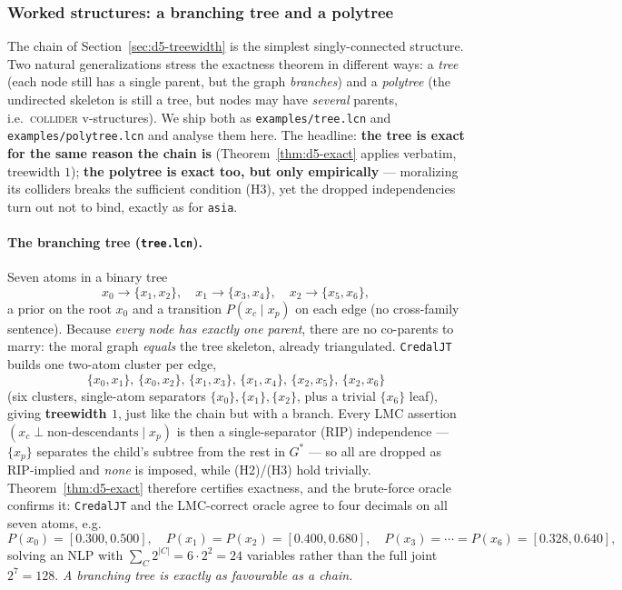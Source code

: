 \documentclass[11pt]{article}
\begin{document}
\subsubsection{Worked structures: a branching tree and a polytree}\label{sec:d5-tree-polytree}

The chain of Section~\ref{sec:d5-treewidth} is the simplest singly-connected structure. Two natural
generalizations stress the exactness theorem in different ways: a \emph{tree} (each node still has a
single parent, but the graph \emph{branches}) and a \emph{polytree} (the undirected skeleton is still
a tree, but nodes may have \emph{several} parents, i.e.\ \textsc{collider} v-structures). We ship both
as \texttt{examples/tree.lcn} and \texttt{examples/polytree.lcn} and analyse them here. The headline:
\textbf{the tree is exact for the same reason the chain is} (Theorem~\ref{thm:d5-exact} applies
verbatim, treewidth $1$); \textbf{the polytree is exact too, but only empirically} --- moralizing its
colliders breaks the sufficient condition (H3), yet the dropped independencies turn out not to bind,
exactly as for \texttt{asia}.

\paragraph{The branching tree (\texttt{tree.lcn}).} Seven atoms in a binary tree
\[
  x_0\to\{x_1,x_2\},\quad x_1\to\{x_3,x_4\},\quad x_2\to\{x_5,x_6\},
\]
a prior on the root $x_0$ and a transition $P(x_c\mid x_p)$ on each edge (no cross-family sentence).
Because \emph{every node has exactly one parent}, there are no co-parents to marry: the moral graph
\emph{equals} the tree skeleton, already triangulated. \texttt{CredalJT} builds one two-atom cluster
per edge,
\[
  \{x_0,x_1\},\,\{x_0,x_2\},\,\{x_1,x_3\},\,\{x_1,x_4\},\,\{x_2,x_5\},\,\{x_2,x_6\}
\]
(six clusters, single-atom separators $\{x_0\},\{x_1\},\{x_2\}$, plus a trivial $\{x_6\}$ leaf),
giving \textbf{treewidth $1$}, just like the chain but with a branch. Every LMC assertion
$(x_c\perp\text{non-descendants}\mid x_p)$ is then a single-separator (RIP) independence ---
$\{x_p\}$ separates the child's subtree from the rest in $G^\ast$ --- so all are dropped as
RIP-implied and \emph{none} is imposed, while (H2)/(H3) hold trivially. Theorem~\ref{thm:d5-exact}
therefore certifies exactness, and the brute-force oracle confirms it: \texttt{CredalJT} and the
LMC-correct oracle agree to four decimals on all seven atoms, e.g.
\[
  P(x_0)=[0.300,0.500],\quad P(x_1)=P(x_2)=[0.400,0.680],\quad
  P(x_3)=\cdots=P(x_6)=[0.328,0.640],
\]
solving an NLP with $\sum_C 2^{|C|}=6\cdot 2^2=24$ variables rather than the full joint
$2^7=128$. \emph{A branching tree is exactly as favourable as a chain.}
\end{document}
